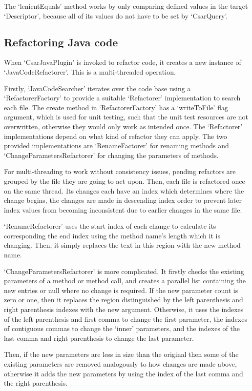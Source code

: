 \documentclass[12pt, letterpaper]{article}
\begin{document}
The `lenientEquals' method works by only comparing defined values in the target `Descriptor', because all of its values do not have to be set by `CsarQuery'.

\subsection{Refactoring Java code}
When `CsarJavaPlugin' is invoked to refactor code, it creates a new instance of `JavaCodeRefactorer'.
This is a multi-threaded operation.

Firstly, `JavaCodeSearcher' iterates over the code base using a `RefactorerFactory' to provide a suitable `Refactorer' implementation to search each file.
The create method in `RefactorerFactory' has a `writeToFile' flag argument, which is used for unit testing, such that the unit test resources are not overwritten, otherwise they would only work as intended once.
The `Refactorer' implementations depend on what kind of refactor they can apply.
The two provided implementations are `RenameFactorer' for renaming methods and `ChangeParametersRefactorer' for changing the parameters of methods.

For multi-threading to work without consistency issues, pending refactors are grouped by the file they are going to act upon.
Then, each file is refactored once on the same thread.
Its changes each have an index which determines where the change begins, the changes are made in descending index order to prevent later index values from becoming inconsistent due to earlier changes in the same file.

`RenameRefactorer' uses the start index of each change to calculate its corresponding the end index using the method name's length which it is changing.
Then, it simply replaces the text in this region with the new method name.

`ChangeParametersRefactorer' is more complicated.
It firstly checks the existing parameters of a method or method call, and creates a parallel list containing the new entries or null where no change is required.
If the new parameter count is zero or one, then it replaces the region distinguished by the left parenthesis and right parenthesis indexes with the new argument.
Otherwise, it uses the indexes of the left parenthesis and first comma to change the first parameter, the indexes of contiguous commas to change the `inner' parameters, and the indexes of the last comma and right parenthesis to change the last parameter.

Then, if the new parameters are less in size than the original then some of the existing parameters are removed analogously to how changes are made above, otherwise it adds the new parameters by using the index of the last comma and the right parenthesis.
\end{document}
